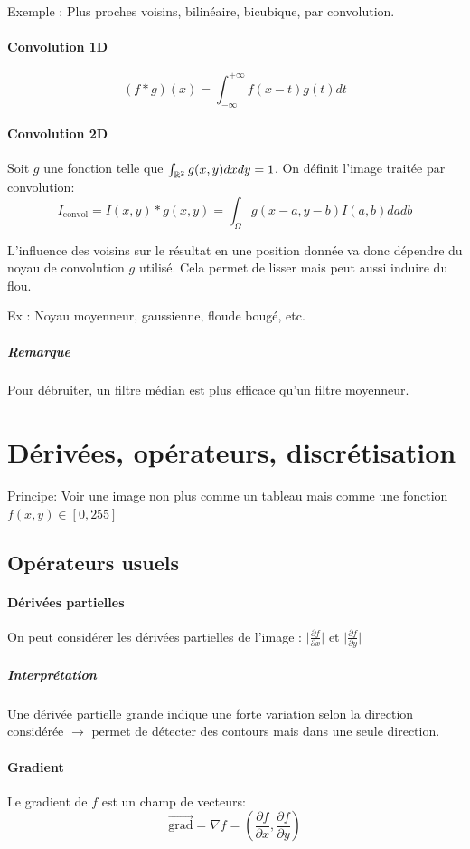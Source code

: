 \documentclass[french]{article}
\begin{document}
Exemple : Plus proches voisins, bilinéaire, bicubique, par convolution.

\paragraph{Convolution 1D}
$$(f * g)(x) = \int_{-\infty}^{+\infty}f(x-t) g(t) dt$$

\paragraph{Convolution 2D}
Soit $g$ une fonction telle que $\int_{\Bbb{R}^2}g(x,y)dxdy=1$.
On définit l'image traitée par convolution:
$$I_{\text{convol}} = I(x,y) * g(x, y) = \int_{\Omega}g(x - a, y -b) I(a,b) da db$$

L'influence des voisins sur le résultat en une position donnée va donc
dépendre du noyau de convolution $g$ utilisé. Cela permet de lisser mais
peut aussi induire du flou.

Ex : Noyau moyenneur, gaussienne, floude bougé, etc.

\subparagraph{Remarque} Pour débruiter, un filtre médian est plus
efficace qu'un filtre moyenneur.

\section{Dérivées, opérateurs, discrétisation}
Principe: Voir une image non plus comme un tableau mais comme une fonction
$f(x,y) \in [0, 255]$


\subsection{Opérateurs usuels}

\paragraph{Dérivées partielles}
On peut considérer les dérivées partielles de l'image :
$\vert \frac{\partial f}{\partial x} \vert$ et $\vert \frac{\partial f}{\partial y} \vert$

\subparagraph{Interprétation} Une dérivée partielle grande indique une forte
variation selon la direction considérée $\longrightarrow$ permet de
détecter des contours mais dans une seule direction.

\paragraph{Gradient} Le gradient de $f$ est un champ de vecteurs:
$$\vec{\text{grad}} = \nabla f =
\left(\frac{\partial f}{\partial x}, \frac{\partial f}{\partial y} \right)$$
\end{document}
